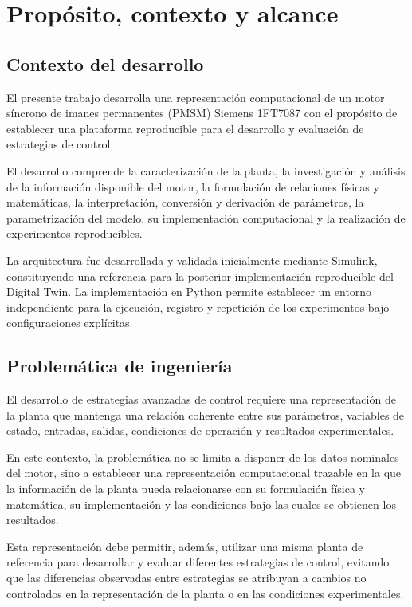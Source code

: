 \section{Propósito, contexto y alcance}

\subsection{Contexto del desarrollo}

El presente trabajo desarrolla una representación computacional de un motor síncrono de imanes permanentes (PMSM) Siemens 1FT7087 con el propósito de establecer una plataforma reproducible para el desarrollo y evaluación de estrategias de control.

El desarrollo comprende la caracterización de la planta, la investigación y análisis de la información disponible del motor, la formulación de relaciones físicas y matemáticas, la interpretación, conversión y derivación de parámetros, la parametrización del modelo, su implementación computacional y la realización de experimentos reproducibles.

La arquitectura fue desarrollada y validada inicialmente mediante Simulink, constituyendo una referencia para la posterior implementación reproducible del Digital Twin. La implementación en Python permite establecer un entorno independiente para la ejecución, registro y repetición de los experimentos bajo configuraciones explícitas.

\subsection{Problemática de ingeniería}

El desarrollo de estrategias avanzadas de control requiere una representación de la planta que mantenga una relación coherente entre sus parámetros, variables de estado, entradas, salidas, condiciones de operación y resultados experimentales.

En este contexto, la problemática no se limita a disponer de los datos nominales del motor, sino a establecer una representación computacional trazable en la que la información de la planta pueda relacionarse con su formulación física y matemática, su implementación y las condiciones bajo las cuales se obtienen los resultados.

Esta representación debe permitir, además, utilizar una misma planta de referencia para desarrollar y evaluar diferentes estrategias de control, evitando que las diferencias observadas entre estrategias se atribuyan a cambios no controlados en la representación de la planta o en las condiciones experimentales.

